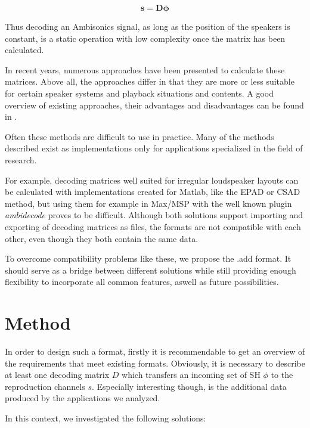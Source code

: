 \documentclass[a4paper, 10pt, twocolumn]{article}
\begin{document}
\begin{equation}
    \boldsymbol{s}=\boldsymbol{D} \boldsymbol{\phi}
\end{equation}

Thus decoding an Ambisonics signal, as long as the position of the speakers is constant, is a static operation with low complexity once the matrix has been calculated.

In recent years, numerous approaches have been presented to calculate these matrices. Above all, the approaches differ in that they are more or less suitable for certain speaker systems and playback situations and contents. A good overview of existing approaches, their advantages and disadvantages can be found in \cite{allradepadcomp} \cite{unstablemmd} \cite{allrad} \cite{csad} \cite{epad}.

Often these methods are difficult to use in practice. Many of the methods described exist as implementations only for applications specialized in the field of research. 

For example, decoding matrices well suited for irregular loudspeaker layouts can be calculated with implementations created for Matlab, like the EPAD \cite{epad} or CSAD \cite{csad} method, but using them for example in Max/MSP with the well known plugin \textit{ambidecode\texttildelow} \cite{ICSTAmbiPaper} proves to be difficult. Although both solutions support importing and exporting of decoding matrices as files, the formats are not compatible with each other, even though they both contain the same data.

To overcome compatibility problems like these, we propose the .add format. It should serve as a bridge between different solutions while still providing enough flexibility to incorporate all common features, aswell as future possibilities.

\section{Method} \label{sec:Method}

In order to design such a format, firstly it is recommendable to get an overview of the requirements that meet existing formats. Obviously, it is necessary to describe at least one decoding matrix $ D $ which transfers an incoming set of SH $ \phi $ to the reproduction channels $ s $. Especially interesting though, is the additional data produced by the applications we analyzed.

In this context, we investigated the following solutions:
\end{document}
